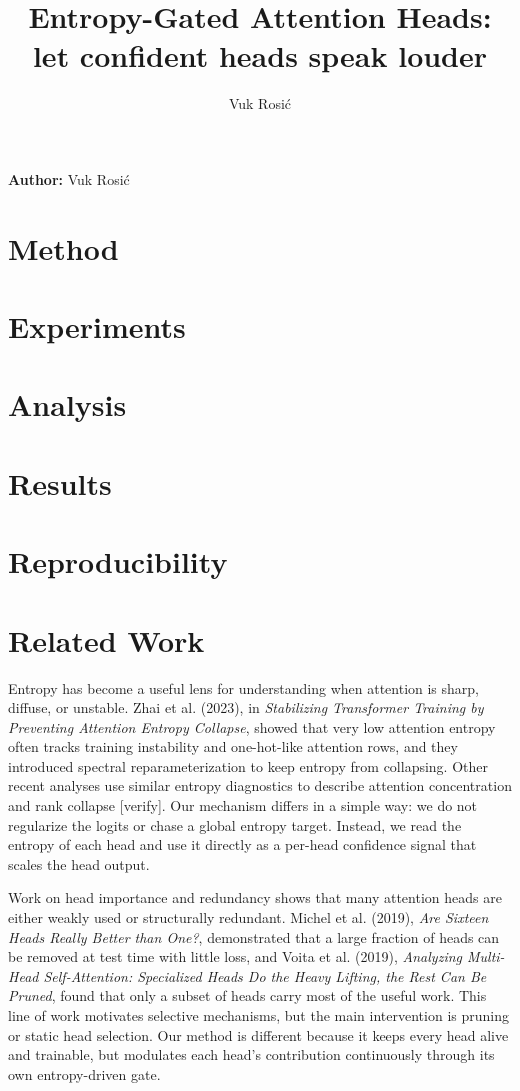 \documentclass[11pt,a4paper]{article}
\title{Entropy-Gated Attention Heads: let confident heads speak louder}
\author{Vuk Rosić}
\date{}
\begin{document}
\maketitle

\textbf{Author:} Vuk Rosić

\begin{abstract}

\end{abstract}

\section{Method}

\section{Experiments}

\section{Analysis}

\section{Results}

\section{Reproducibility}
\section{Related Work}
Entropy has become a useful lens for understanding when attention is sharp, diffuse, or unstable. Zhai et al. (2023), in \emph{Stabilizing Transformer Training by Preventing Attention Entropy Collapse}, showed that very low attention entropy often tracks training instability and one-hot-like attention rows, and they introduced spectral reparameterization to keep entropy from collapsing. Other recent analyses use similar entropy diagnostics to describe attention concentration and rank collapse [verify]. Our mechanism differs in a simple way: we do not regularize the logits or chase a global entropy target. Instead, we read the entropy of each head and use it directly as a per-head confidence signal that scales the head output.

Work on head importance and redundancy shows that many attention heads are either weakly used or structurally redundant. Michel et al. (2019), \emph{Are Sixteen Heads Really Better than One?}, demonstrated that a large fraction of heads can be removed at test time with little loss, and Voita et al. (2019), \emph{Analyzing Multi-Head Self-Attention: Specialized Heads Do the Heavy Lifting, the Rest Can Be Pruned}, found that only a subset of heads carry most of the useful work. This line of work motivates selective mechanisms, but the main intervention is pruning or static head selection. Our method is different because it keeps every head alive and trainable, but modulates each head's contribution continuously through its own entropy-driven gate.
\end{document}
